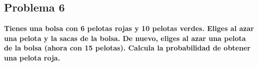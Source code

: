 \subsection*{Problema 6}
\textbf{Tienes una bolsa con 6 pelotas rojas y 10 pelotas verdes. Eliges al azar una pelota y la sacas de la bolsa. De nuevo, eliges al azar una pelota de la bolsa (ahora con 15 pelotas). Calcula la probabilidad de obtener una pelota roja.}